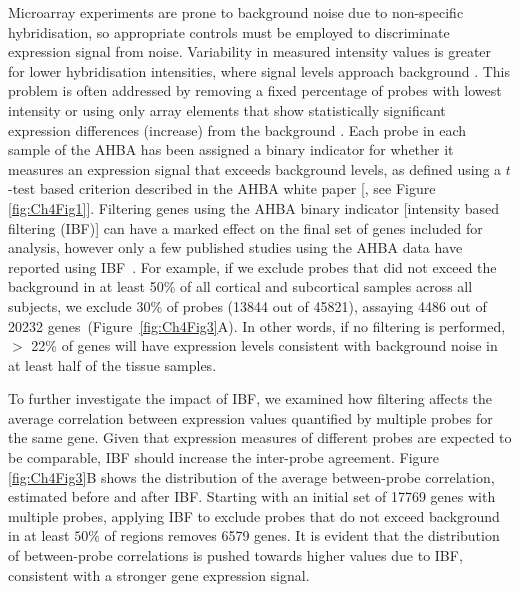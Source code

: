 Microarray experiments are prone to background noise due to non-specific hybridisation, so appropriate controls must be employed to discriminate expression signal from noise. Variability in measured intensity values is greater for lower hybridisation intensities, where signal levels approach background \citep{Quackenbush2002a}. This problem is often addressed by removing a fixed percentage of probes with lowest intensity or using only array elements that show statistically significant expression differences (increase) from the background \citep{Quackenbush2002a}. Each probe in each sample of the AHBA has been assigned a binary indicator for whether it measures an expression signal that exceeds background levels, as defined using a $t$-test based criterion described in the AHBA white paper [\citep{AHBAdoc}, see Figure \ref{fig:Ch4Fig1}]. Filtering genes using the AHBA binary indicator [intensity based filtering (IBF)] can have a marked effect on the final set of genes included for analysis, however only a few published studies using the AHBA data have reported using \mbox{IBF \citep{Hawrylycz2012,Richiardi2015,Burt2018}}. For example, if we exclude probes that did not exceed the background in at least 50\% of all cortical and subcortical samples across all subjects, we exclude 30\% of probes (\num{13844} out of \num{45821}), assaying \num{4486} out of \num{20232} \mbox{genes (Figure \ref{fig:Ch4Fig3}A)}. In other words, if no filtering is performed, $>$ 22\% of genes will have expression levels consistent with background noise in at least half of the tissue samples.

To further investigate the impact of IBF, we examined how filtering affects the average correlation between expression values quantified by multiple probes for the same gene. Given that expression measures of different probes are expected to be comparable, IBF should increase the inter-probe agreement. Figure \ref{fig:Ch4Fig3}B shows the distribution of the average between-probe correlation, estimated before and after IBF. Starting with an initial set of \num{17769} genes with multiple probes, applying IBF to exclude probes that do not exceed background in at least $50\%$ of regions removes \num{6579} genes. It is evident that the distribution of between-probe correlations is pushed towards higher values due to IBF, consistent with a stronger gene expression signal.

